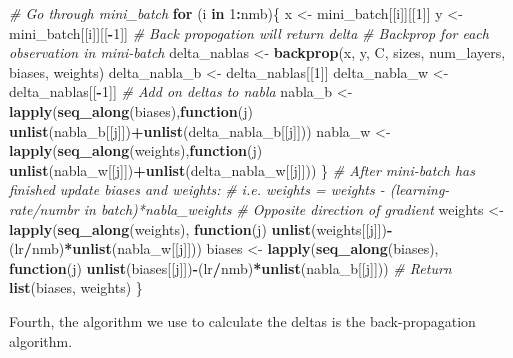 \documentclass[]{book}
\newenvironment{Shaded}{\begin{snugshade}}{\end{snugshade}}
\newcommand{\CommentTok}[1]{\textcolor[rgb]{0.56,0.35,0.01}{\textit{#1}}}
\newcommand{\ControlFlowTok}[1]{\textcolor[rgb]{0.13,0.29,0.53}{\textbf{#1}}}
\newcommand{\DecValTok}[1]{\textcolor[rgb]{0.00,0.00,0.81}{#1}}
\newcommand{\KeywordTok}[1]{\textcolor[rgb]{0.13,0.29,0.53}{\textbf{#1}}}
\newcommand{\NormalTok}[1]{#1}
\newcommand{\OperatorTok}[1]{\textcolor[rgb]{0.81,0.36,0.00}{\textbf{#1}}}
\newcommand{\StringTok}[1]{\textcolor[rgb]{0.31,0.60,0.02}{#1}}
\begin{document}
\begin{Shaded}
\begin{Highlighting}[]
   \CommentTok{# Go through mini_batch}
   \ControlFlowTok{for}\NormalTok{ (i }\ControlFlowTok{in} \DecValTok{1}\OperatorTok{:}\NormalTok{nmb)\{}
\NormalTok{     x <-}\StringTok{ }\NormalTok{mini_batch[[i]][[}\DecValTok{1}\NormalTok{]]}
\NormalTok{     y <-}\StringTok{ }\NormalTok{mini_batch[[i]][[}\OperatorTok{-}\DecValTok{1}\NormalTok{]]}
     \CommentTok{# Back propogation will return delta}
     \CommentTok{# Backprop for each observation in mini-batch}
\NormalTok{     delta_nablas <-}\StringTok{ }\KeywordTok{backprop}\NormalTok{(x, y, C, sizes, num_layers, biases, weights)}
\NormalTok{     delta_nabla_b <-}\StringTok{ }\NormalTok{delta_nablas[[}\DecValTok{1}\NormalTok{]]}
\NormalTok{     delta_nabla_w <-}\StringTok{ }\NormalTok{delta_nablas[[}\OperatorTok{-}\DecValTok{1}\NormalTok{]]}
     \CommentTok{# Add on deltas to nabla}
\NormalTok{     nabla_b <-}\StringTok{ }\KeywordTok{lapply}\NormalTok{(}\KeywordTok{seq_along}\NormalTok{(biases),}\ControlFlowTok{function}\NormalTok{(j)}
       \KeywordTok{unlist}\NormalTok{(nabla_b[[j]])}\OperatorTok{+}\KeywordTok{unlist}\NormalTok{(delta_nabla_b[[j]]))}
\NormalTok{     nabla_w <-}\StringTok{ }\KeywordTok{lapply}\NormalTok{(}\KeywordTok{seq_along}\NormalTok{(weights),}\ControlFlowTok{function}\NormalTok{(j)}
       \KeywordTok{unlist}\NormalTok{(nabla_w[[j]])}\OperatorTok{+}\KeywordTok{unlist}\NormalTok{(delta_nabla_w[[j]]))}
\NormalTok{   \}}
   \CommentTok{# After mini-batch has finished update biases and weights:}
   \CommentTok{# i.e. weights = weights - (learning-rate/numbr in batch)*nabla_weights}
   \CommentTok{# Opposite direction of gradient}
\NormalTok{   weights <-}\StringTok{ }\KeywordTok{lapply}\NormalTok{(}\KeywordTok{seq_along}\NormalTok{(weights), }\ControlFlowTok{function}\NormalTok{(j)}
     \KeywordTok{unlist}\NormalTok{(weights[[j]])}\OperatorTok{-}\NormalTok{(lr}\OperatorTok{/}\NormalTok{nmb)}\OperatorTok{*}\KeywordTok{unlist}\NormalTok{(nabla_w[[j]]))}
\NormalTok{   biases <-}\StringTok{ }\KeywordTok{lapply}\NormalTok{(}\KeywordTok{seq_along}\NormalTok{(biases), }\ControlFlowTok{function}\NormalTok{(j)}
     \KeywordTok{unlist}\NormalTok{(biases[[j]])}\OperatorTok{-}\NormalTok{(lr}\OperatorTok{/}\NormalTok{nmb)}\OperatorTok{*}\KeywordTok{unlist}\NormalTok{(nabla_b[[j]]))}
   \CommentTok{# Return}
   \KeywordTok{list}\NormalTok{(biases, weights)}
\NormalTok{ \}}
\end{Highlighting}
\end{Shaded}

Fourth, the algorithm we use to calculate the deltas is the back-propagation algorithm.
\end{document}
